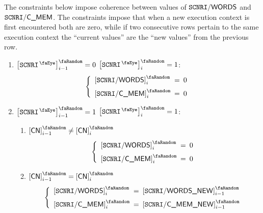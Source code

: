 The constraints below impose coherence between values of
$\texttt{SCNRI}\textsf{/}{\textsf{\textsf{WORDS}}}$ and
$\texttt{SCNRI}\textsf{/}{\textsf{\textsf{C\_MEM}}} $.
The constraints impose that when a new execution context is first encountered both are zero,
while if two consecutive rows pertain to the same execution context the ``current values'' are the ``new values'' from the previous row.
\begin{enumerate}
	\item
		\If $\order{\isMxpScenario} _{i - 1} = 0$
		\et $\order{\isMxpScenario} _{i}     = 1$:
		\Then
		\[
			\left\{ \begin{array}{lcl}
				\order{\mxpScenarioWords} _{i} & \!\!\! = \!\!\! & 0 \vspace{2mm} \\
				\order{\mxpScenarioCmem}  _{i} & \!\!\! = \!\!\! & 0              \\
			\end{array} \right.
		\]
	\item
		\If $\order{\isMxpScenario} _{i - 1} = 1$
		\et $\order{\isMxpScenario} _{i}     = 1$:
		\Then
		\begin{enumerate}
			\item \If $\order{\cn}_{i - 1} \neq \order{\cn}_{i}$ \Then
				\[
					\left\{ \begin{array}{lcl}
						\order{\mxpScenarioWords} _{i} & \!\!\! = \!\!\! & 0 \vspace{2mm} \\
						\order{\mxpScenarioCmem}  _{i} & \!\!\! = \!\!\! & 0 \\
					\end{array} \right.
				\]
			\item \If $\order{\cn}_{i - 1} = \order{\cn}_{i}$ \Then
				\[
					\left\{ \begin{array}{lcl}
						\order{\mxpScenarioWords} _{i} & \!\!\! = \!\!\! & \order{\mxpScenarioWordsNew} _{i - 1} \vspace{2mm} \\
						\order{\mxpScenarioCmem}  _{i} & \!\!\! = \!\!\! & \order{\mxpScenarioCmemNew } _{i - 1} \\
					\end{array} \right.
				\]
		\end{enumerate}
\end{enumerate}
